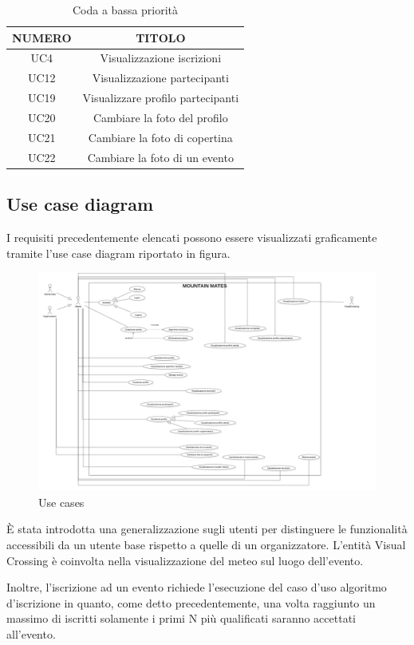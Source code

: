 \begin{table}
\begin{center}
\begin{tabular}{ |c|c|}
 \hline
 \textbf{NUMERO}& \textbf{TITOLO} \\ \hline
 UC4& Visualizzazione iscrizioni\\ \hline
 UC12& Visualizzazione partecipanti\\ \hline
 UC19& Visualizzare profilo partecipanti\\ \hline
 UC20& Cambiare la foto del profilo\\ \hline
 UC21& Cambiare la foto di copertina\\ \hline
 UC22& Cambiare la foto di un evento\\ \hline
\end{tabular}
  \caption{Coda a bassa priorità}
  \label{tab: bassa-priorità}
\end{center}
\end{table}

\clearpage
\subsection{Use case diagram}
I requisiti precedentemente elencati possono essere visualizzati graficamente tramite l'use case diagram riportato in figura.

\begin{figure}[ht!]
    \centering
    \includegraphics[scale=0.55]{Iterazione 0/immagini/UseCases.png}
    \caption{Use cases}
    \label{fig: usecases}
  \end{figure}

È stata introdotta una generalizzazione sugli utenti per distinguere le funzionalità accessibili da un utente base
rispetto a quelle di un organizzatore.
L'entità Visual Crossing è coinvolta nella visualizzazione del meteo sul luogo dell'evento.

Inoltre, l'iscrizione ad un evento richiede l'esecuzione del caso d'uso algoritmo d'iscrizione in quanto, come detto precedentemente,
una volta raggiunto un massimo di iscritti solamente i primi N più qualificati saranno accettati all'evento.